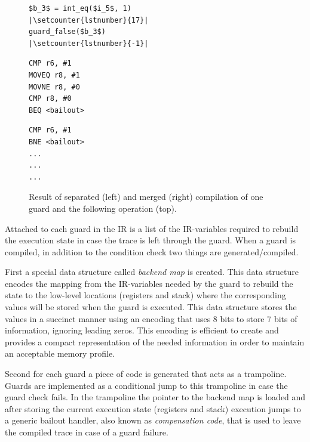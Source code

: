 \documentclass[10pt,preprint]{sigplanconf}
\begin{document}
\begin{figure}[ht]
  \noindent
  \centering
  \begin{minipage}{1\columnwidth}
\begin{lstlisting}[xleftmargin=20pt,xrightmargin=20pt,framexleftmargin=5pt,framexrightmargin=-10pt,mathescape, numbers=right, escapechar=|, firstnumber=18,frame=b]
$b_3$ = int_eq($i_5$, 1)                    |\setcounter{lstnumber}{17}|
guard_false($b_3$)                          |\setcounter{lstnumber}{-1}|
\end{lstlisting}
  \end{minipage}
  \begin{minipage}{.40\columnwidth}
    \begin{lstlisting}
CMP r6, #1
MOVEQ r8, #1
MOVNE r8, #0
CMP r8, #0
BEQ <bailout>
    \end{lstlisting}
  \end{minipage}
  \hfill
  \begin{minipage}{.40\columnwidth}
    \begin{lstlisting}
CMP r6, #1
BNE <bailout>
...
...
...
    \end{lstlisting}
  \end{minipage}
  \caption{Result of separated (left) and merged (right) compilation of one guard and the following operation (top).}
  \label{fig:trace-compiled}
\end{figure}

Attached to each guard in the IR is a list of the IR-variables required to
rebuild the execution state in case the trace is left through
the guard. When a guard is compiled, in addition to the
condition check two things are generated/compiled.

First a special data
structure called \emph{backend map} is created. This data structure encodes the
mapping from the IR-variables needed by the guard to rebuild the state to the
low-level locations (registers and stack) where the corresponding values will
be stored when the guard is executed.
This data
structure stores the values in a succinct manner using an encoding that uses
8 bits to store 7 bits of information, ignoring leading zeros. This encoding is efficient to create and
provides a compact representation of the needed information in order
to maintain an acceptable memory profile.

Second for each guard a piece of code is generated that acts as a trampoline.
Guards are implemented as a conditional jump to this trampoline in case the
guard check fails.
In the trampoline the pointer to the
backend map is loaded and after storing the current execution state
(registers and stack) execution jumps to a generic bailout handler, also known
as \emph{compensation code},
that is used to leave the compiled trace in case of a guard failure.
\end{document}
